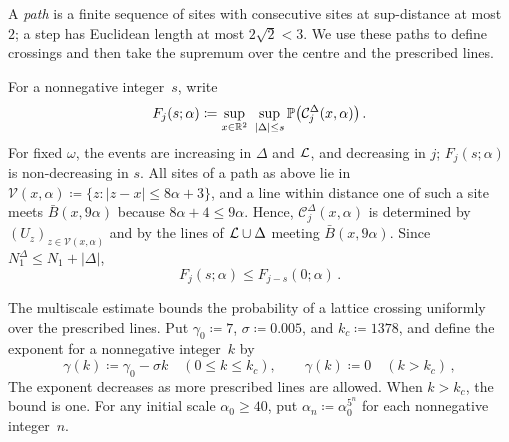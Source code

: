 \documentclass[11pt,letterpaper]{article}
\newcommand{\cC}{\mathcal C}
\begin{document}
A \emph{path} is a finite sequence of sites with consecutive sites at sup-distance at most~$2$; a step has Euclidean length at most $2\sqrt2<3$. We use these paths to define crossings and then take the supremum over the centre and the prescribed lines.


For a nonnegative integer~$s$, write
\begin{equation*}
  F_j(s;\alpha)\coloneqq\sup_{x\in\R^2}\ \sup_{\lvert\Delta\rvert\le s}\P\bigl(\cC_j^{\Delta}(x,\alpha)\bigr)\,.
\end{equation*}
For fixed $\omega$, the events are increasing in $\Delta$ and $\mathcal L$, and decreasing in $j$; $F_j(s;\alpha)$ is non-decreasing in $s$. All sites of a path as above lie in $\mathcal V(x,\alpha)\coloneqq\{z\colon\lvert z-x\rvert\le8\alpha+3\}$, and a line within distance one of such a site meets $\bar B(x,9\alpha)$ because $8\alpha+4\le9\alpha$. Hence, $\cC_j^{\Delta}(x,\alpha)$ is determined by $(U_z)_{z\in \mathcal V(x,\alpha)}$ and by the lines of $\mathcal L\cup\Delta$ meeting $\bar B(x,9\alpha)$. Since $N_1^\Delta\le N_1+\lvert\Delta\rvert$,
\begin{equation}
\label{sub:eq:trivial}
  F_j(s;\alpha)\le F_{j-s}(0;\alpha)\,.
\end{equation}

The multiscale estimate bounds the probability of a lattice crossing uniformly over the prescribed lines. Put $\gamma_0\coloneqq7$, $\sigma\coloneqq0.005$, and $k_c\coloneqq1378$, and define the exponent for a nonnegative integer~$k$ by
\begin{equation}
\label{sub:eq:gamma}
  \gamma(k)\coloneqq\gamma_0-\sigma k\quad(0\le k\le k_c),\qquad\gamma(k)\coloneqq0\quad(k>k_c)\,,
\end{equation}
The exponent decreases as more prescribed lines are allowed. When $k>k_c$, the bound is one. For any initial scale $\alpha_0\ge40$, put $\alpha_n\coloneqq\alpha_0^{5^n}$ for each nonnegative integer~$n$.

\end{document}
